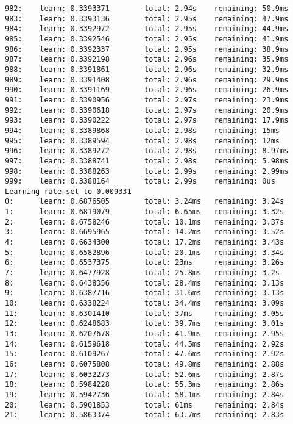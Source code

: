 \documentclass[11pt]{article}
\begin{document}
\begin{Verbatim}[commandchars=\\\{\}]
982:    learn: 0.3393371        total: 2.94s    remaining: 50.9ms
983:    learn: 0.3393136        total: 2.95s    remaining: 47.9ms
984:    learn: 0.3392972        total: 2.95s    remaining: 44.9ms
985:    learn: 0.3392546        total: 2.95s    remaining: 41.9ms
986:    learn: 0.3392337        total: 2.95s    remaining: 38.9ms
987:    learn: 0.3392198        total: 2.96s    remaining: 35.9ms
988:    learn: 0.3391861        total: 2.96s    remaining: 32.9ms
989:    learn: 0.3391408        total: 2.96s    remaining: 29.9ms
990:    learn: 0.3391169        total: 2.96s    remaining: 26.9ms
991:    learn: 0.3390956        total: 2.97s    remaining: 23.9ms
992:    learn: 0.3390618        total: 2.97s    remaining: 20.9ms
993:    learn: 0.3390222        total: 2.97s    remaining: 17.9ms
994:    learn: 0.3389868        total: 2.98s    remaining: 15ms
995:    learn: 0.3389594        total: 2.98s    remaining: 12ms
996:    learn: 0.3389272        total: 2.98s    remaining: 8.97ms
997:    learn: 0.3388741        total: 2.98s    remaining: 5.98ms
998:    learn: 0.3388263        total: 2.99s    remaining: 2.99ms
999:    learn: 0.3388164        total: 2.99s    remaining: 0us
Learning rate set to 0.009331
0:      learn: 0.6876505        total: 3.24ms   remaining: 3.24s
1:      learn: 0.6819079        total: 6.65ms   remaining: 3.32s
2:      learn: 0.6758246        total: 10.1ms   remaining: 3.37s
3:      learn: 0.6695965        total: 14.2ms   remaining: 3.52s
4:      learn: 0.6634300        total: 17.2ms   remaining: 3.43s
5:      learn: 0.6582896        total: 20.1ms   remaining: 3.34s
6:      learn: 0.6537375        total: 23ms     remaining: 3.26s
7:      learn: 0.6477928        total: 25.8ms   remaining: 3.2s
8:      learn: 0.6438356        total: 28.4ms   remaining: 3.13s
9:      learn: 0.6387716        total: 31.6ms   remaining: 3.13s
10:     learn: 0.6338224        total: 34.4ms   remaining: 3.09s
11:     learn: 0.6301410        total: 37ms     remaining: 3.05s
12:     learn: 0.6248683        total: 39.7ms   remaining: 3.01s
13:     learn: 0.6207678        total: 41.9ms   remaining: 2.95s
14:     learn: 0.6159618        total: 44.5ms   remaining: 2.92s
15:     learn: 0.6109267        total: 47.6ms   remaining: 2.92s
16:     learn: 0.6075808        total: 49.8ms   remaining: 2.88s
17:     learn: 0.6032273        total: 52.6ms   remaining: 2.87s
18:     learn: 0.5984228        total: 55.3ms   remaining: 2.86s
19:     learn: 0.5942736        total: 58.1ms   remaining: 2.84s
20:     learn: 0.5901853        total: 61ms     remaining: 2.84s
21:     learn: 0.5863374        total: 63.7ms   remaining: 2.83s

\end{Verbatim}
\end{document}
